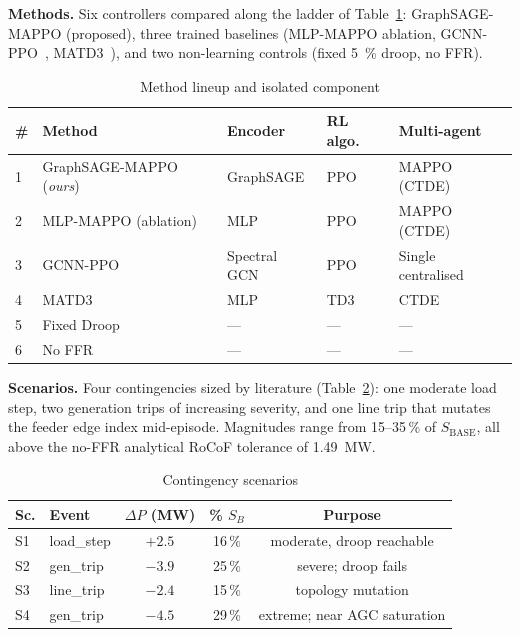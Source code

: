 \textbf{Methods.} Six controllers compared along the ladder of
Table~\ref{tab:methods}: GraphSAGE-MAPPO (proposed), three trained baselines
(MLP-MAPPO ablation, GCNN-PPO~\cite{guo2024gcnn}, MATD3~\cite{li2025matd3}),
and two non-learning controls (fixed 5~\% droop, no FFR).

\begin{table}[!t]
\caption{Method lineup and isolated component}
\label{tab:methods}
\centering
\footnotesize
\begin{tabular}{lllll}
\toprule
\# & Method & Encoder & RL algo. & Multi-agent \\
\midrule
1 & GraphSAGE-MAPPO (\emph{ours}) & GraphSAGE   & PPO     & MAPPO (CTDE) \\
2 & MLP-MAPPO (ablation)          & MLP         & PPO     & MAPPO (CTDE) \\
3 & GCNN-PPO~\cite{guo2024gcnn}   & Spectral GCN& PPO     & Single centralised \\
4 & MATD3~\cite{li2025matd3}      & MLP         & TD3     & CTDE \\
5 & Fixed Droop                   & ---         & ---     & --- \\
6 & No FFR                        & ---         & ---     & --- \\
\bottomrule
\end{tabular}
\end{table}

\textbf{Scenarios.} Four contingencies sized by literature
(Table~\ref{tab:scenarios}): one moderate load step, two generation trips of
increasing severity, and one line trip that mutates the feeder edge index
mid-episode. Magnitudes range from 15--35\,\% of $S_{\text{BASE}}$, all above
the no-FFR analytical RoCoF tolerance of 1.49~MW.

\begin{table}[!t]
\caption{Contingency scenarios}
\label{tab:scenarios}
\centering
\footnotesize
\begin{tabular}{llccc}
\toprule
Sc. & Event       & $\Delta P$ (MW) & \% $S_B$ & Purpose \\
\midrule
S1  & load\_step  & $+2.5$  & 16\,\% & moderate, droop reachable \\
S2  & gen\_trip   & $-3.9$  & 25\,\% & severe; droop fails \\
S3  & line\_trip  & $-2.4$  & 15\,\% & topology mutation \\
S4  & gen\_trip   & $-4.5$  & 29\,\% & extreme; near AGC saturation \\
\bottomrule
\end{tabular}
\end{table}

